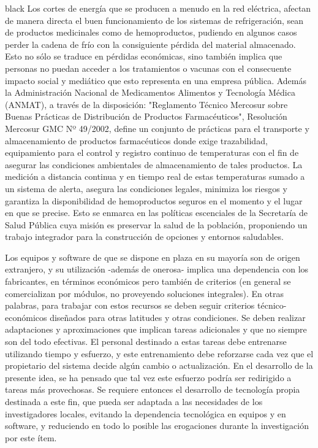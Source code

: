 \documentclass[11pt]{charter}
\begin{document}
\begin{consigna}{black}
Los cortes de energía que se producen a menudo en la red eléctrica, afectan de manera directa el buen funcionamiento de los sistemas de refrigeración, sean de productos medicinales como de hemoproductos, pudiendo en algunos casos perder la cadena de frío con la consiguiente pérdida del material almacenado. Esto no sólo se traduce en pérdidas económicas, sino también implica que personas no puedan acceder a los tratamientos o vacunas con el consecuente impacto social y mediático que esto representa en una empresa pública. 
Además la Administración Nacional de Medicamentos Alimentos y Tecnología Médica (ANMAT), a través de la disposición: "Reglamento Técnico Mercosur sobre Buenas Prácticas de Distribución de Productos Farmacéuticos", Resolución Mercosur GMC Nº 49/2002, define un conjunto de prácticas para el transporte y almacenamiento de productos farmacéuticos donde exige trazabilidad, equipamiento para el control y registro continuo de temperaturas con el fin de asegurar las condiciones ambientales de almacenamiento de tales productos. 
La medición a distancia continua y en tiempo real de estas temperaturas sumado a un sistema de alerta, asegura las condiciones legales, minimiza los riesgos y garantiza la disponibilidad de hemoproductos seguros en el momento y el lugar en que se precise. Esto se enmarca en las políticas escenciales de la Secretaría de Salud Pública cuya misión es preservar la salud de la población, proponiendo un trabajo integrador para la construcción de opciones y entornos saludables.

Los equipos y software de que se dispone en plaza en su mayoría son de origen extranjero, y su utilización -además de onerosa- implica una dependencia con los fabricantes, en términos económicos pero también de criterios (en general se comercializan por módulos, no proveyendo soluciones integrales). En otras palabras, para trabajar con estos recursos se deben seguir criterios técnico-económicos diseñados para otras latitudes y otras condiciones. Se deben realizar adaptaciones y aproximaciones que implican tareas adicionales y que no siempre son del todo efectivas. El personal destinado a estas tareas debe entrenarse utilizando tiempo y esfuerzo, y este entrenamiento debe reforzarse cada vez que el propietario del sistema decide algún cambio o actualización. En el desarrollo de la presente idea, se ha pensado que tal vez este esfuerzo podría ser redirigido a tareas más provechosas.
Se requiere entonces el desarrollo de tecnología propia destinada a este fin, que pueda ser adaptada a las necesidades de los investigadores locales, evitando la dependencia tecnológica en equipos y en software, y reduciendo en todo lo posible las erogaciones durante la investigación por este ítem.


\end{consigna}
\end{document}
